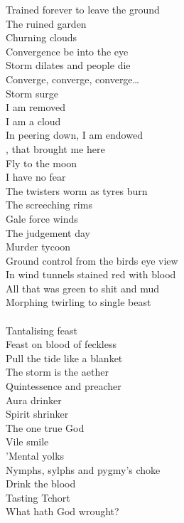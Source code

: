 Trained forever to leave the ground \\
The ruined garden \\
Churning clouds \\
Convergence be into the eye \\
Storm dilates and people die \\

Converge, converge, converge… \\
Storm surge \\

I am removed \\
I am a cloud \\
In peering down, I am endowed \\
, that brought me here \\
Fly to the moon \\
I have no fear \\

The twisters worm as tyres burn \\
The screeching rims \\
Gale force winds \\
The judgement day \\
Murder tycoon \\
Ground control from the birds eye view \\

In wind tunnels stained red with blood \\
All that was green to shit and mud \\

Morphing twirling to single beast \\
 \\
Tantalising feast \\

Feast on blood of feckless \\
Pull the tide like a blanket \\

The storm is the aether \\
Quintessence and preacher \\
Aura drinker \\
Spirit shrinker \\
The one true God \\
Vile smile \\
'Mental yolks \\
Nymphs, sylphs and pygmy's choke \\
Drink the blood \\
Tasting Tchort \\
What hath God wrought? \\

